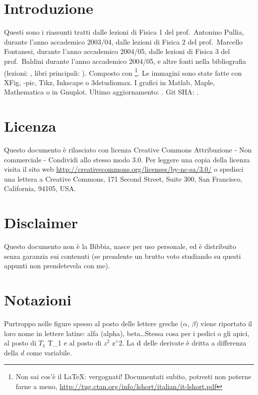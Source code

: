 \sffamily\itshape
\section*{\centering Introduzione}

Questi sono i riassunti tratti dalle lezioni di Fisica 1 del %
prof.~Antonino Pullia, durante l'anno accademico 2003/04, dalle lezioni di Fisica 2 del prof.~Marcello Fontanesi, durante l'anno accademico 2004/05, dalle lezioni di Fisica 3 del prof.~Baldini durante l'anno accademico 2004/05, e altre fonti nella bibliografia (lezioni: \cite{Pullia, Fontanesi, Baldini, Paganoni, Lucchini, Franzoni, Monica, Barney, Maddalena}, libri principali: \cite{Fisica1, Feynm, modern, elettro, ottica, enge, alonso, jackson, mazzoldi}). Composto con \LaTeXe\footnote{Non sai cos'è il \LaTeX: vergognati! Documentati subito, potresti non poterne farne a meno, \href{http://tug.ctan.org/info/lshort/italian/it-lshort.pdf}{http://tug.ctan.org/info/lshort/italian/it-lshort.pdf}}. Le immagini sono state fatte con XFig, \Xy-pic, Tikz, Inkscape o 3dstudiomax. I grafici in Matlab, Maple, Mathematica o in Gnuplot.
\newline\newline
Ultimo aggiornamento: \gitAuthorDate. Git SHA: \texttt{\gitAbbrevHash}.

\section*{\centering Licenza}
Questo documento è rilasciato con licenza Creative Commons Attribuzione - Non commerciale - Condividi allo stesso modo 3.0. Per leggere una copia della licenza visita il sito web \url{http://creativecommons.org/licenses/by-nc-sa/3.0/} o spedisci una lettera a Creative Commons, 171 Second Street, Suite 300, San Francisco, California, 94105, USA. \ccbyncsaeu

\section*{\centering Disclaimer}
Questo documento non è la Bibbia, nasce per uso personale, ed è distribuito senza garanzia sui contenuti (se prendente un brutto voto studiando su questi appunti non prendetevela con me).
\section*{\centering Notazioni}
Purtroppo nelle figure spesso al posto delle lettere greche ($\alpha$, $\beta$) viene riportato il loro nome in lettere latine: alfa (alpha), beta\ldots Stessa cosa per i pedici o gli apici, al posto di $T_1$ T\_1 e al posto di $z^2$ z$^\wedge$2. La $\mathrm{d}$ delle derivate è dritta a differenza della $d$ come variabile.
\newpage
